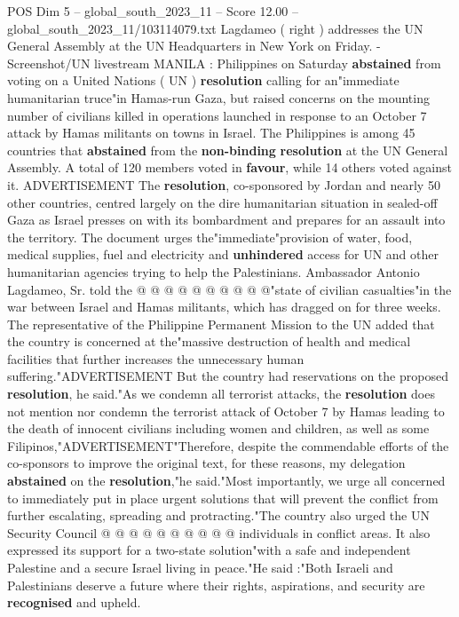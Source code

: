\begin{textsample}{POS Dim 5 – global\_south\_2023\_11 – Score 12.00 – global\_south\_2023\_11/103114079.txt}  \label{ex:f5_pos_258}
Lagdameo ( right ) addresses the UN General Assembly at the UN Headquarters in New York on Friday. - Screenshot/UN livestream MANILA : Philippines on Saturday \textbf{abstained} from voting on a United Nations ( UN ) \textbf{resolution} calling for an"immediate humanitarian truce"in Hamas-run Gaza, but raised concerns on the mounting number of civilians killed in operations launched in response to an October 7 attack by Hamas militants on towns in Israel.
The Philippines is among 45 countries that \textbf{abstained} from the \textbf{non-binding} \textbf{resolution} at the UN General Assembly.
A total of 120 members voted in \textbf{favour}, while 14 others voted against it.
ADVERTISEMENT The \textbf{resolution}, co-sponsored by Jordan and nearly 50 other countries, centred largely on the dire humanitarian situation in sealed-off Gaza as Israel presses on with its bombardment and prepares for an assault into the territory.
The document urges the"immediate"provision of water, food, medical supplies, fuel and electricity and \textbf{unhindered} access for UN and other humanitarian agencies trying to help the Palestinians.
Ambassador Antonio Lagdameo, Sr. told the @ @ @ @ @ @ @ @ @ @"state of civilian casualties"in the war between Israel and Hamas militants, which has dragged on for three weeks.
The representative of the Philippine Permanent Mission to the UN added that the country is concerned at the"massive destruction of health and medical facilities that further increases the unnecessary human suffering."ADVERTISEMENT But the country had reservations on the proposed \textbf{resolution}, he said."As we condemn all terrorist attacks, the \textbf{resolution} does not mention nor condemn the terrorist attack of October 7 by Hamas leading to the death of innocent civilians including women and children, as well as some Filipinos,"ADVERTISEMENT"Therefore, despite the commendable efforts of the co-sponsors to improve the original text, for these reasons, my delegation \textbf{abstained} on the \textbf{resolution},"he said."Most importantly, we urge all concerned to immediately put in place urgent solutions that will prevent the conflict from further escalating, spreading and protracting."The country also urged the UN Security Council @ @ @ @ @ @ @ @ @ @ individuals in conflict areas.
It also expressed its support for a two-state solution"with a safe and independent Palestine and a secure Israel living in peace."He said :"Both Israeli and Palestinians deserve a future where their rights, aspirations, and security are \textbf{recognised} and upheld.

\end{textsample}
